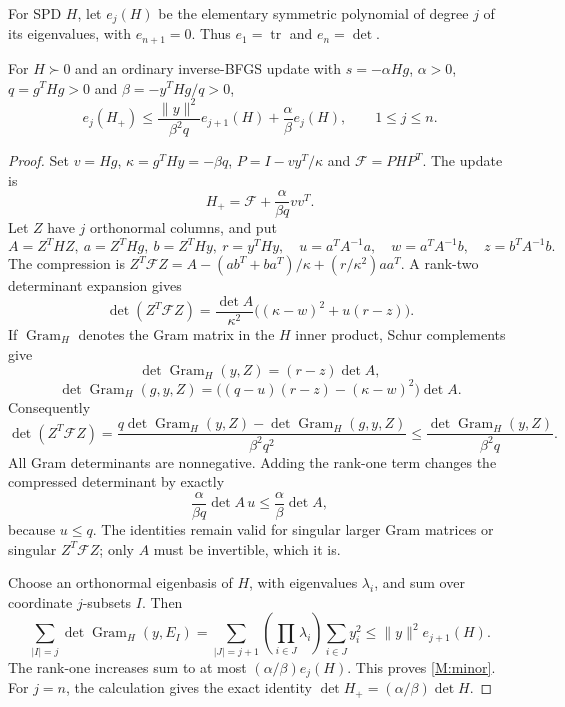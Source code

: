 For SPD $H$, let $e_j(H)$ be the elementary symmetric polynomial of degree $j$ of its eigenvalues, with $e_{n+1}=0$. Thus $e_1=\operatorname{tr}$ and $e_n=\det$.

\begin{theorem}\label{M:hierarchy}
For $H\succ0$ and an ordinary inverse-BFGS update with $s=-\alpha Hg$, $\alpha>0$, $q=g^THg>0$ and $\beta=-y^THg/q>0$,
\begin{equation}\label{M:minor}
 e_j(H_+)\le \frac{\|y\|^2}{\beta^2q}e_{j+1}(H)+\frac\alpha\beta e_j(H),\qquad1\le j\le n.
\end{equation}
\end{theorem}
\begin{proof}
Set $v=Hg$, $\kappa=g^THy=-\beta q$, $P=I-vy^T/\kappa$ and $\mathcal F=PHP^T$. The update is
\[
 H_+=\mathcal F+\frac{\alpha}{\beta q}vv^T.
\]
Let $Z$ have $j$ orthonormal columns, and put
\[
 A=Z^THZ,\ a=Z^THg,\ b=Z^THy,\ r=y^THy,
 \quad u=a^TA^{-1}a,\quad w=a^TA^{-1}b,\quad z=b^TA^{-1}b.
\]
The compression is $Z^T\mathcal FZ=A-(ab^T+ba^T)/\kappa+(r/\kappa^2)aa^T$. A rank-two determinant expansion gives
\[
 \det(Z^T\mathcal FZ)=\frac{\det A}{\kappa^2}\bigl((\kappa-w)^2+u(r-z)\bigr).
\]
If $\operatorname{Gram}_H$ denotes the Gram matrix in the $H$ inner product, Schur complements give
\[
 \det\operatorname{Gram}_H(y,Z)=(r-z)\det A,
\]
\[
 \det\operatorname{Gram}_H(g,y,Z)
 =\bigl((q-u)(r-z)-(\kappa-w)^2\bigr)\det A.
\]
Consequently
\begin{equation}\label{M:compression}
 \det(Z^T\mathcal FZ)
 =\frac{q\det\operatorname{Gram}_H(y,Z)-\det\operatorname{Gram}_H(g,y,Z)}{\beta^2q^2}
 \le\frac{\det\operatorname{Gram}_H(y,Z)}{\beta^2q}.
\end{equation}
All Gram determinants are nonnegative. Adding the rank-one term changes the compressed determinant by exactly
\[
 \frac{\alpha}{\beta q}\det A\,u\le\frac\alpha\beta\det A,
\]
because $u\le q$. The identities remain valid for singular larger Gram matrices or singular $Z^T\mathcal FZ$; only $A$ must be invertible, which it is.

Choose an orthonormal eigenbasis of $H$, with eigenvalues $\lambda_i$, and sum over coordinate $j$-subsets $I$. Then
\[
 \sum_{|I|=j}\det\operatorname{Gram}_H(y,E_I)
 =\sum_{|J|=j+1}\left(\prod_{i\in J}\lambda_i\right)\sum_{i\in J}y_i^2
 \le\|y\|^2e_{j+1}(H).
\]
The rank-one increases sum to at most $(\alpha/\beta)e_j(H)$. This proves \eqref{M:minor}. For $j=n$, the calculation gives the exact identity $\det H_+=(\alpha/\beta)\det H$.
\end{proof}

